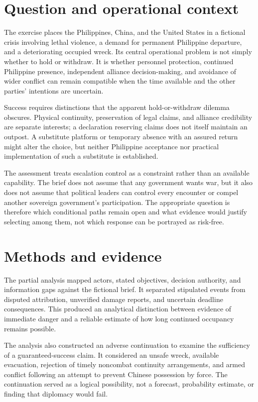 \documentclass[11pt]{article}
\begin{document}
\section{Question and operational context}
The exercise places the Philippines, China, and the United States in a fictional crisis involving lethal violence, a demand for permanent Philippine departure, and a deteriorating occupied wreck. Its central operational problem is not simply whether to hold or withdraw. It is whether personnel protection, continued Philippine presence, independent alliance decision-making, and avoidance of wider conflict can remain compatible when the time available and the other parties' intentions are uncertain.

Success requires distinctions that the apparent hold-or-withdraw dilemma obscures. Physical continuity, preservation of legal claims, and alliance credibility are separate interests; a declaration reserving claims does not itself maintain an outpost. A substitute platform or temporary absence with an assured return might alter the choice, but neither Philippine acceptance nor practical implementation of such a substitute is established.

The assessment treats escalation control as a constraint rather than an available capability. The brief does not assume that any government wants war, but it also does not assume that political leaders can control every encounter or compel another sovereign government's participation. The appropriate question is therefore which conditional paths remain open and what evidence would justify selecting among them, not which response can be portrayed as risk-free.

\section{Methods and evidence}
The partial analysis mapped actors, stated objectives, decision authority, and information gaps against the fictional brief. It separated stipulated events from disputed attribution, unverified damage reports, and uncertain deadline consequences. This produced an analytical distinction between evidence of immediate danger and a reliable estimate of how long continued occupancy remains possible.

The analysis also constructed an adverse continuation to examine the sufficiency of a guaranteed-success claim. It considered an unsafe wreck, available evacuation, rejection of timely noncombat continuity arrangements, and armed conflict following an attempt to prevent Chinese possession by force. The continuation served as a logical possibility, not a forecast, probability estimate, or finding that diplomacy would fail.
\end{document}
